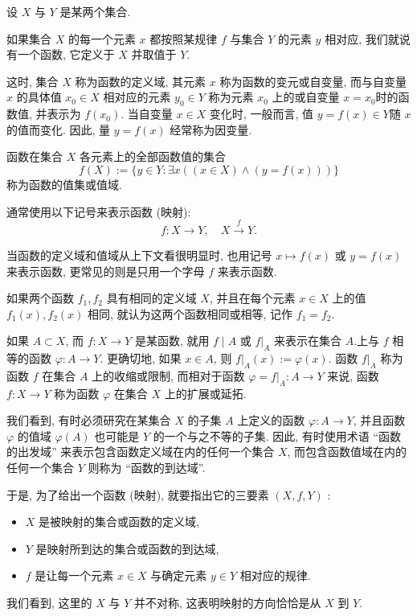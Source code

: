 \documentclass{ctexart}
\begin{document}
设 $X$ 与 $Y$ 是某两个集合.

如果集合 $X$ 的每一个元素 $x$ 都按照某规律 $f$ 与集合 $Y$ 的元素 $y$ 相对应, 我们就说有一个函数, 它定义于 $X$ 并取值于 $Y$.

这时, 集合 $X$ 称为函数的定义域, 其元素 $x$ 称为函数的变元或自变量, 而与自变量 $x$ 的具体值 $x_0 \in X$ 相对应的元素 $y_0 \in Y$ 称为元素 $x_0$ 上的或自变量 $x=x_0$时的函数值, 并表示为 $f\left(x_0\right)$. 当自变量 $x \in X$ 变化时, 一般而言, 值 $y=f(x) \in Y$随 $x$ 的值而变化. 因此, 量 $y=f(x)$ 经常称为因变量.

函数在集合 $X$ 各元素上的全部函数值的集合
$$
f(X):=\{y \in Y : \exists x((x \in X) \wedge(y=f(x)))\}
$$
称为函数的值集或值域.

通常使用以下记号来表示函数 (映射):
$$
f: X \rightarrow Y, \quad X \xrightarrow{f} Y .
$$

当函数的定义域和值域从上下文看很明显时, 也用记号 $x \mapsto f(x)$ 或 $y=f(x)$来表示函数, 更常见的则是只用一个字母 $f$ 来表示函数.

如果两个函数 $f_1, f_2$ 具有相同的定义域 $X$, 并且在每个元素 $x \in X$ 上的值 $f_1(x), f_2(x)$ 相同, 就认为这两个函数相同或相等, 记作 $f_1=f_2$.

如果 $A \subset X$, 而 $f: X \rightarrow Y$ 是某函数, 就用 $f \mid A$ 或 $\left.f\right|_A$ 来表示在集合 $A$.上与 $f$ 相等的函数 $\varphi: A \rightarrow Y$. 更确切地, 如果 $x \in A$, 则 $\left.f\right|_A(x):=\varphi(x)$. 函数 $\left.f\right|_A$ 称为函数 $f$ 在集合 $A$ 上的收缩或限制, 而相对于函数 $\varphi=\left.f\right|_A: A \rightarrow Y$ 来说, 函数 $f: X \rightarrow Y$ 称为函数 $\varphi$ 在集合 $X$ 上的扩展或延拓.

我们看到, 有时必须研究在某集合 $X$ 的子集 $A$ 上定义的函数 $\varphi: A \rightarrow Y$, 并且函数 $\varphi$ 的值域 $\varphi(A)$ 也可能是 $Y$ 的一个与之不等的子集. 因此, 有时使用术语 “函数的出发域” 来表示包含函数定义域在内的任何一个集合 $X$, 而包含函数值域在内的任何一个集合 $Y$ 则称为 “函数的到达域”.

于是, 为了给出一个函数 (映射), 就要指出它的三要素 $(X, f, Y)$ :
\begin{itemize}
    \item  $X$ 是被映射的集合或函数的定义域,
    \item $Y$ 是映射所到达的集合或函数的到达域,
    \item $f$ 是让每一个元素 $x \in X$ 与确定元素 $y \in Y$ 相对应的规律.
\end{itemize}

我们看到, 这里的 $X$ 与 $Y$ 并不对称, 这表明映射的方向恰恰是从 $X$ 到 $Y$.
\end{document}
